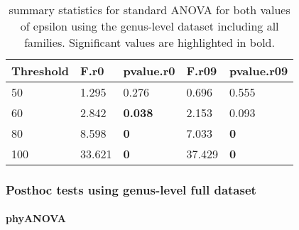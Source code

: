 \documentclass[]{article}
\let\oldparagraph\paragraph
\renewcommand{\paragraph}[1]{\oldparagraph{#1}\mbox{}}
\begin{document}
\begin{table}[H]

\caption{\label{tab:unnamed-chunk-31}summary statistics for standard ANOVA for both values of epsilon using the genus-level dataset including all families. Significant values are highlighted in bold.}
\centering
\begin{tabular}{l|l|l|l|l}
\hline
Threshold & F.r0 & pvalue.r0 & F.r09 & pvalue.r09\\
\hline
50 & 1.295 & 0.276 & 0.696 & 0.555\\
\hline
60 & 2.842 & \textbf{0.038} & 2.153 & 0.093\\
\hline
80 & 8.598 & \textbf{0} & 7.033 & \textbf{0}\\
\hline
100 & 33.621 & \textbf{0} & 37.429 & \textbf{0}\\
\hline
\end{tabular}
\end{table}

\hypertarget{posthoc-tests-using-genus-level-full-dataset}{%
\subsubsection{Posthoc tests using genus-level full
dataset}\label{posthoc-tests-using-genus-level-full-dataset}}

\hypertarget{phyanova-7}{%
\paragraph{phyANOVA}\label{phyanova-7}}
\end{document}

